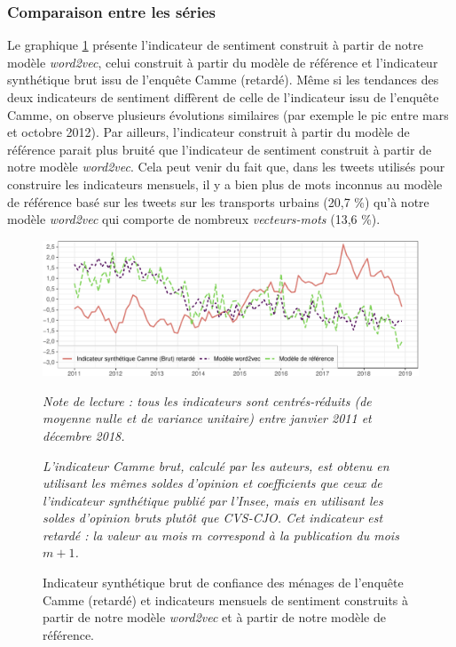 \documentclass[11pt,french,french]{article}
\begin{document}
\hypertarget{subsec:compseries}{%
\subsubsection{Comparaison entre les séries}\label{subsec:compseries}}

Le graphique \ref{fig:bslogcam} présente l'indicateur de sentiment construit à partir de notre modèle \emph{word2vec}, celui construit à partir du modèle de référence et l'indicateur synthétique brut issu de l'enquête Camme (retardé).
Même si les tendances des deux indicateurs de sentiment diffèrent de celle de l'indicateur issu de l'enquête Camme, on observe plusieurs évolutions similaires (par exemple le pic entre mars et octobre 2012).
Par ailleurs, l'indicateur construit à partir du modèle de référence parait plus bruité que l'indicateur de sentiment construit à partir de notre modèle \emph{word2vec}.
Cela peut venir du fait que, dans les tweets utilisés pour construire les indicateurs mensuels, il y a bien plus de mots inconnus au modèle de référence basé sur les tweets sur les transports urbains (20,7 \%) qu'à notre modèle \emph{word2vec} qui comporte de nombreux \emph{vecteurs-mots} (13,6 \%).

\begin{figure}[htp]
{\centering \includegraphics[width =\textwidth]{img/rmd-graphSentiments-1}}
\captionsetup{margin=0cm,format=hang,justification=justified}
\caption{Indicateur synthétique brut de confiance des ménages de l'enquête Camme (retardé) et indicateurs mensuels de sentiment construits à partir de notre modèle \emph{word2vec} et à partir de notre modèle de référence.}\label{fig:bslogcam}
\footnotesize
\emph{Note de lecture : tous les indicateurs sont centrés-réduits (de moyenne nulle et de variance unitaire) entre janvier 2011 et décembre 2018.}

\emph{L'indicateur Camme brut, calculé par les auteurs, est obtenu en utilisant les mêmes soldes d'opinion et coefficients que ceux de l'indicateur synthétique publié par l'Insee, mais en utilisant les soldes d'opinion bruts plutôt que CVS-CJO.
Cet indicateur est retardé : la valeur au mois $m$ correspond à la publication du mois $m+1$.}
\end{figure}
\end{document}
